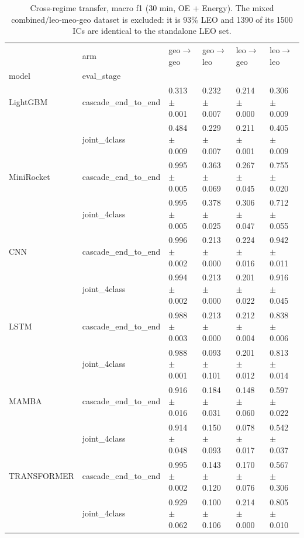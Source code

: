 \begin{table}
\centering
\caption{Cross-regime transfer, macro f1 (30 min, OE + Energy). The mixed combined/leo-meo-geo dataset is excluded: it is 93\% LEO and 1390 of its 1500 ICs are identical to the standalone LEO set.}
\label{tab:transfer_f1}
\begin{tabular}{llllll}
\toprule
            & arm & geo$\rightarrow$geo & geo$\rightarrow$leo & leo$\rightarrow$geo & leo$\rightarrow$leo \\
model & eval_stage &                     &                     &                     &                     \\
\midrule
LightGBM & cascade_end_to_end &   0.313 $\pm$ 0.001 &   0.232 $\pm$ 0.007 &   0.214 $\pm$ 0.000 &   0.306 $\pm$ 0.009 \\
            & joint_4class &   0.484 $\pm$ 0.009 &   0.229 $\pm$ 0.007 &   0.211 $\pm$ 0.001 &   0.405 $\pm$ 0.009 \\
MiniRocket & cascade_end_to_end &   0.995 $\pm$ 0.005 &   0.363 $\pm$ 0.069 &   0.267 $\pm$ 0.045 &   0.755 $\pm$ 0.020 \\
            & joint_4class &   0.995 $\pm$ 0.005 &   0.378 $\pm$ 0.025 &   0.306 $\pm$ 0.047 &   0.712 $\pm$ 0.055 \\
CNN & cascade_end_to_end &   0.996 $\pm$ 0.002 &   0.213 $\pm$ 0.000 &   0.224 $\pm$ 0.016 &   0.942 $\pm$ 0.011 \\
            & joint_4class &   0.994 $\pm$ 0.002 &   0.213 $\pm$ 0.000 &   0.201 $\pm$ 0.022 &   0.916 $\pm$ 0.045 \\
LSTM & cascade_end_to_end &   0.988 $\pm$ 0.003 &   0.213 $\pm$ 0.000 &   0.212 $\pm$ 0.004 &   0.838 $\pm$ 0.006 \\
            & joint_4class &   0.988 $\pm$ 0.001 &   0.093 $\pm$ 0.101 &   0.201 $\pm$ 0.012 &   0.813 $\pm$ 0.014 \\
MAMBA & cascade_end_to_end &   0.916 $\pm$ 0.016 &   0.184 $\pm$ 0.031 &   0.148 $\pm$ 0.060 &   0.597 $\pm$ 0.022 \\
            & joint_4class &   0.914 $\pm$ 0.048 &   0.150 $\pm$ 0.093 &   0.078 $\pm$ 0.017 &   0.542 $\pm$ 0.037 \\
TRANSFORMER & cascade_end_to_end &   0.995 $\pm$ 0.002 &   0.143 $\pm$ 0.120 &   0.170 $\pm$ 0.076 &   0.567 $\pm$ 0.306 \\
            & joint_4class &   0.929 $\pm$ 0.062 &   0.100 $\pm$ 0.106 &   0.214 $\pm$ 0.000 &   0.805 $\pm$ 0.010 \\
\bottomrule
\end{tabular}
\end{table}
